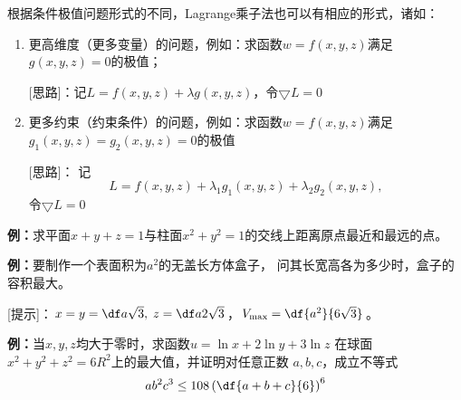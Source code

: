 根据条件极值问题形式的不同，Lagrange乘子法也可以有相应的形式，诸如：
\begin{enumerate}[(1)]
  \setlength{\itemindent}{1cm}
  \item 更高维度（更多变量）的问题，例如：求函数$w=f(x,y,z)$满足$g(x,y,z)=0$的极值； 
  
  [思路]：记$L=f(x,y,z)+\lambda g(x,y,z)$，令$\bigtriangledown L=0$ 
  \item 更多约束（约束条件）的问题，例如：求函数$w=f(x,y,z)$满足$g_1(x,y,z)=g_2(x,y,z)=0$的极值 
  
  [思路]： 记
  $$L=f(x,y,z)+\lambda_1 g_1(x,y,z)+\lambda_2 g_2(x,y,z),$$
  令$\bigtriangledown L=0$
\end{enumerate}

{\bf 例：}求平面$x+y+z=1$与柱面$x^2+y^2=1$的交线上距离原点最近和最远的点。
\begin{center}
\end{center}

{\bf 例：}要制作一个表面积为$a^2$的无盖长方体盒子，
问其长宽高各为多少时，盒子的容积最大。

[提示]：$x=y=\df a{\sqrt 3},\;z=\df a{2\sqrt3}$，$V_{\max}=\df{a^2}{6\sqrt 3}$。

{\bf 例：}当$x,y,z$均大于零时，求函数$u=\ln x+2\ln y+3\ln z$
在球面$x^2+y^2+z^2=6R^2$上的最大值，并证明对任意正数
$a,b,c$，成立不等式
$$ab^2c^3\leq 108\left(\df{a+b+c}{6}\right)^6$$

